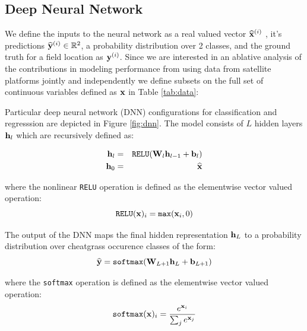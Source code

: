 \documentclass{article} %
\begin{document}
\subsection{Deep Neural Network}\label{dnn}

We define the inputs to the neural network as a real valued vector $\widehat{{\bf x}}^{(i)}$ , it's predictions $\widehat{{\bf y}}^{(i)}\in \mathbb{R}^2$, a probability distribution over 2 classes, and the ground truth for a field location as ${\bf y}^{(i)}$. Since we are interested in an ablative analysis of the contributions in modeling performance from using data from satellite platforms jointly and independently we define subsets on the full set of continuous variables defined as ${\bf x}$ in Table \ref{tab:data}:

Particular deep neural network (DNN) configurations for classification and regresssion are depicted in Figure \ref{fig:dnn}. The model consists of $L$ hidden layers ${\bf h}_l$ which are recursively defined as:

\begin{eqnarray}
{\bf h}_l &= &\texttt{RELU}({\bf W}_l {\bf h}_{l-1} + {\bf b}_l)\\
{\bf h}_0&=&\widehat{{\bf x}}
\end{eqnarray}

where the nonlinear \texttt{RELU} operation is defined as the elementwise vector valued operation:
\begin{equation}
\texttt{RELU}({\bf x})_i = \texttt{max}({\bf x}_i, 0)
\end{equation}


The output of the DNN maps the final hidden representation ${\bf h}_L$ to a probability distribution over cheatgrass occurence classes of the form:
\begin{equation}
\widehat{{\bf y}} = \texttt{softmax}({\bf W}_{L+1}{\bf h}_L + {\bf b}_{L+1})
\end{equation}

where the \texttt{softmax} operation is defined as the elementwise vector valued operation:
\begin{equation}
\texttt{softmax}({\bf x})_i = \frac{e^{{\bf x}_i}}{\sum_{j}e^{{\bf x}_j}}
\end{equation}
\end{document}
